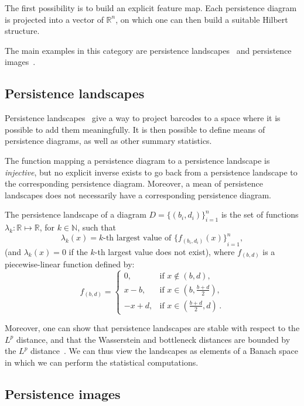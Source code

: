 \documentclass[a4paper,11pt,openany,extrafontsizes]{memoir}
\begin{document}
The first possibility is to build an explicit feature map. Each
persistence diagram is projected into a vector of $\mathbb{R}^n$, on
which one can then build a suitable Hilbert structure.

The main examples in this category are persistence
landscapes~\parencite{bubenik_statistical_2015} and persistence
images~\cite{adams_persistence_2017}.

\subsection{Persistence landscapes}

Persistence landscapes~\cite{bubenik_statistical_2015} give a way to
project barcodes to a space where it is possible to add them
meaningfully. It is then possible to define means of persistence
diagrams, as well as other summary statistics.

The function mapping a persistence diagram to a persistence landscape
is \emph{injective}, but no explicit inverse exists to go back from a
persistence landscape to the corresponding persistence
diagram. Moreover, a mean of persistence landscapes does not
necessarily have a corresponding persistence diagram.

\begin{defn}
  The persistence landscape of a diagram $D = {\{(b_i,d_i)\}}_{i=1}^n$
  is the set of functions $\lambda_k: \mathbb{R} \mapsto \mathbb{R}$,
  for $k\in\mathbb{N}$, such that
  \[ \lambda_k(x) = k\text{-th largest value of } {\{f_{(b_i,
      d_i)}(x)\}}_{i=1}^n, \] (and $\lambda_k(x) = 0$ if the $k$-th
largest value does not exist), where $f_{(b,d)}$ is a piecewise-linear
function defined by:
  \[ f_{(b,d)} =
    \begin{cases}
      0,& \text{if }x \notin (b,d),\\
      x-b,& \text{if }x\in (b,\frac{b+d}{2}),\\
      -x+d,& \text{if }x\in (\frac{b+d}{2},d)\,.
    \end{cases}
  \]
\end{defn}

Moreover, one can show that persistence landscapes are stable with
respect to the $L^p$ distance, and that the Wasserstein and bottleneck
distances are bounded by the $L^p$
distance~\cite{bubenik_statistical_2015}. We can thus view the
landscapes as elements of a Banach space in which we can perform the
statistical computations.

\subsection{Persistence images}
\end{document}
